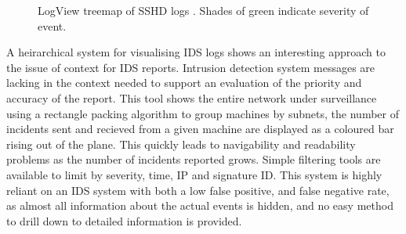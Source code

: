 \begin{figure}[tbh]
\caption{\protect\label{tree} LogView treemap of SSHD logs \cite{4641277}. Shades of green indicate severity of event.}
\end{figure}

A heirarchical system for visualising IDS logs \cite{itoh2006hierarchical} shows an interesting approach to the issue of context for IDS reports. Intrusion detection system messages are lacking in the context needed to support an evaluation of the priority and accuracy of the report. This tool shows the entire network under surveillance using a rectangle packing algorithm to group machines by subnets, the number of incidents sent and recieved from a given machine are displayed as a coloured bar rising out of the plane. This quickly leads to navigability and readability problems as the number of incidents reported grows. Simple filtering tools are available to limit by severity, time, IP and signature ID.
This system is highly reliant on an IDS system with both a low false positive, and false negative rate, as almost all information about the actual events is hidden, and no easy method to drill down to detailed information is provided.

